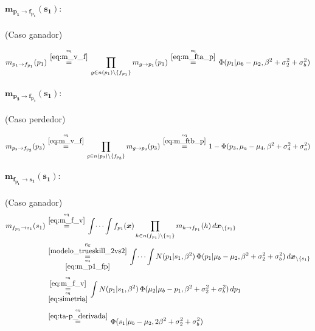 \documentclass[article]{jss}
\newcommand\hfrac[2]{\genfrac{}{}{0pt}{}{#1}{#2}} %
\begin{document}
\paragraph{$\bm{m_{p_1 \rightarrow f_{p_1}}(s_1)}:$} (Caso ganador)

\begin{equation}\label{eq:m_p1_fp}
\begin{split}
 m_{p_1 \rightarrow f_{p_1}}(p_1) \overset{\hfrac{\text{eq}}{\ref{eq:m_v_f}}}{=} \prod_{g \in n(p_1) \setminus  \{f_{p_1} \}} m_{g \rightarrow p_1} (p_1)  \overset{\hfrac{\text{eq}}{\ref{eq:m_fta_p}}}{=}  \Phi(p_1| \mu_b - \mu_2, \beta^2 + \sigma_2^2 + \sigma_b^2)
\end{split}
\end{equation}


\paragraph{$\bm{m_{p_3 \rightarrow f_{p_3}}(s_1)}:$} (Caso perdedor)

\begin{equation}\label{eq:m_p3_fp}
\begin{split}
 m_{p_3 \rightarrow f_{p_3}}(p_3) \overset{\hfrac{\text{eq}}{\ref{eq:m_v_f}}}{=} \prod_{g \in n(p_3) \setminus  \{f_{p_3} \}} m_{g \rightarrow p_3} (p_3)  \overset{\hfrac{\text{eq}}{\ref{eq:m_ftb_p}}}{=}  1 - \Phi(p_3, \mu_a  - \mu_4, \beta^2 + \sigma_4^2 + \sigma_a^2)
\end{split}
\end{equation}

\paragraph{$\bm{m_{f_{p_1} \rightarrow s_1}(s_1)}:$} (Caso ganador)
\begin{equation}\label{eq:m_fp_s1}
\begin{split}
m_{f_{p_1} \rightarrow s_1}(s_1) & \overset{\hfrac{\text{eq}}{\ref{eq:m_f_v}}}{=} \int \dots \int f_{p_1}(\bm{x}) \prod_{h \in n(f_{p_1}) \setminus \{s_1\} } m_{h \rightarrow f_{p_1}}(h) \, d\bm{x}_{\setminus \{s_1\} }  \\
&\overset{\hfrac{\text{fig}}{\ref{modelo_trueskill_2vs2}}}{\underset{\hfrac{\text{eq}}{\ref{eq:m_p1_fp}}}{=}} \int \dots \int N(p_1| s_1, \beta^2) \, \Phi(p_1| \mu_b - \mu_2, \beta^2 + \sigma_2^2 + \sigma_b^2 ) \, d\bm{x}_{\setminus \{s_1\} }
\\[0.1cm]
& \overset{\hfrac{\text{eq}}{\ref{eq:m_f_v}}}{\underset{\hfrac{\text{eq}}{\ref{eq:simetria}}}{=}} \int N(p_1| s_1, \beta^2) \, \Phi(\mu_2| \mu_b -  p_1, \beta^2 + \sigma_2^2 + \sigma_b^2) \, dp_1 \\[0.1cm]
&\overset{\hfrac{\text{eq}}{\ref{eq:ta-p_derivada}}}{=} \Phi(s_1| \mu_b - \mu_2, 2\beta^2 + \sigma_2^2 + \sigma_b^2)
\end{split}
\end{equation}
\end{document}

